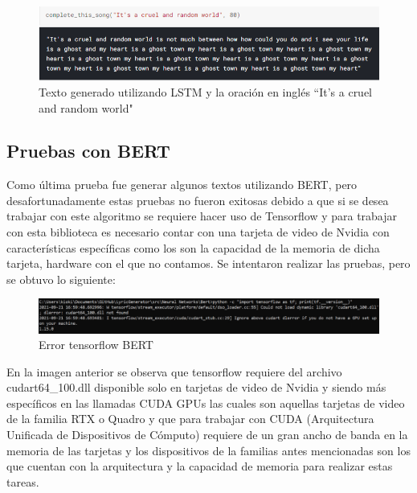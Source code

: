 \documentclass[12pt, a4paper, titlepage]{report}
\begin{document}
	   	\begin{figure}[H]
	   		\includegraphics[width=13cm]{./imagenes/Analisis/Lstm2.png}
	   		\centering 
	   		\caption{Texto generado utilizando LSTM y la oración en inglés ``It's a cruel and random world"}
	   	\end{figure}
	   	
	   	\newpage
	   	
	   	\subsection{Pruebas con BERT}
	   	Como última prueba fue generar algunos textos utilizando BERT, pero desafortunadamente estas pruebas no fueron exitosas debido a que si se desea trabajar con este algoritmo se requiere hacer uso de Tensorflow y para trabajar con esta biblioteca es necesario contar con una tarjeta de video de Nvidia con características específicas como los son la capacidad de la memoria de dicha tarjeta, hardware con el que no contamos. Se intentaron realizar las pruebas, pero se obtuvo lo siguiente: 
	   	\begin{figure}[H]
	   		\includegraphics[width=13.5cm]{./imagenes/Analisis/ErrorBert.png}
	   		\centering 
	   		\caption{Error tensorflow BERT}
	   	\end{figure}
	   	En la imagen anterior se observa que tensorflow requiere del archivo cudart64\_100.dll disponible solo en tarjetas de video de Nvidia y siendo más específicos en las llamadas  CUDA GPUs las cuales son aquellas tarjetas de video de la familia RTX o Quadro y que para trabajar con CUDA (Arquitectura Unificada de Dispositivos de Cómputo) requiere de un gran ancho de banda en la memoria de las tarjetas y los dispositivos de la familias antes mencionadas son los que cuentan con la arquitectura y la capacidad de memoria para realizar estas tareas.
	   	
\end{document}

